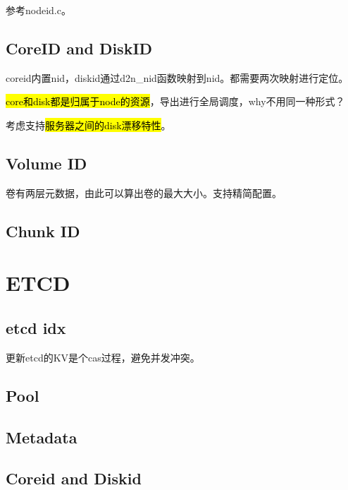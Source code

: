 参考nodeid.c。

\subsection{CoreID and DiskID}

coreid内置nid，diskid通过d2n\_nid函数映射到nid。都需要两次映射进行定位。

\hl{core和disk都是归属于node的资源}，导出进行全局调度，why不用同一种形式？

考虑支持\hl{服务器之间的disk漂移特性}。

\subsection{Volume ID}


卷有两层元数据，由此可以算出卷的最大大小。支持精简配置。

\subsection{Chunk ID}

\section{ETCD}

\subsection{etcd idx}

更新etcd的KV是个cas过程，避免并发冲突。

\subsection{Pool}


\subsection{Metadata}


\subsection{Coreid and Diskid}


